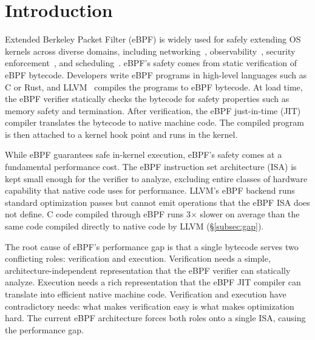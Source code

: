 

\section{Introduction}
\label{sec:introduction}

Extended Berkeley Packet Filter (eBPF) is widely used for safely extending OS kernels across diverse domains, including networking~\cite{cilium,katran}, observability~\cite{tracee}, security enforcement~\cite{krsi_lwn}, and scheduling~\cite{sched_ext_lwn}. eBPF's safety comes from static verification of eBPF bytecode. Developers write eBPF programs in high-level languages such as C or Rust, and LLVM~\cite{lattner2004llvm} compiles the programs to eBPF bytecode. At load time, the eBPF verifier statically checks the bytecode for safety properties such as memory safety and termination. After verification, the eBPF just-in-time (JIT) compiler translates the bytecode to native machine code. The compiled program is then attached to a kernel hook point and runs in the kernel.

While eBPF guarantees safe in-kernel execution, eBPF's safety comes at a fundamental performance cost. The eBPF instruction set architecture (ISA) is kept small enough for the verifier to analyze, excluding entire classes of hardware capability that native code uses for performance. LLVM's eBPF backend runs standard optimization passes but cannot emit operations that the eBPF ISA does not define. C code compiled through eBPF runs 3$\times$ slower on average than the same code compiled directly to native code by LLVM (\S\ref{subsec:gap}).

The root cause of eBPF's performance gap is that a single bytecode serves two conflicting roles: verification and execution. Verification needs a simple, architecture-independent representation that the eBPF verifier can statically analyze. Execution needs a rich representation that the eBPF JIT compiler can translate into efficient native machine code. Verification and execution have contradictory needs: what makes verification easy is what makes optimization hard. The current eBPF architecture forces both roles onto a single ISA, causing the performance gap.

